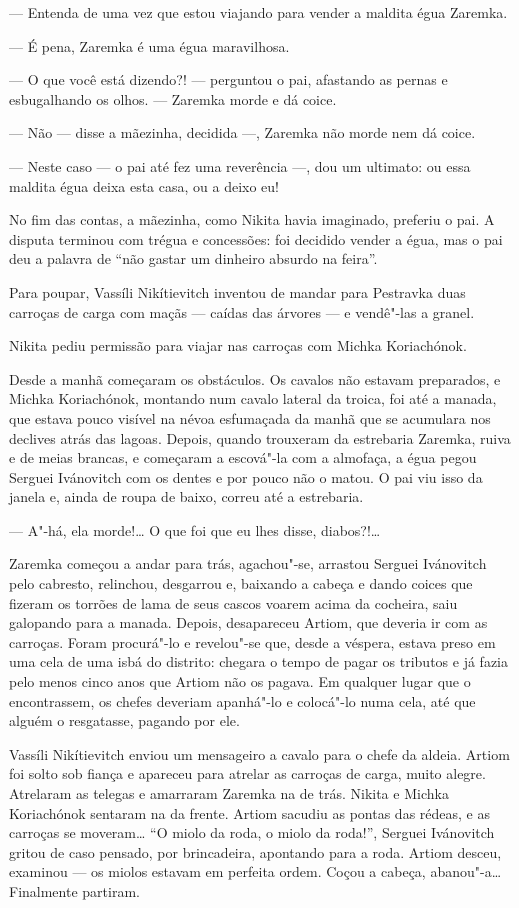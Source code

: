 --- Entenda de uma vez que estou viajando para vender a maldita égua
Zaremka.

--- É pena, Zaremka é uma égua maravilhosa.

--- O que você está dizendo?! --- perguntou o pai, afastando as pernas e
esbugalhando os olhos. --- Zaremka morde e dá coice.

--- Não --- disse a mãezinha, decidida ---, Zaremka não morde nem dá
coice.

--- Neste caso --- o pai até fez uma reverência ---, dou um ultimato: ou
essa maldita égua deixa esta casa, ou a deixo eu!

No fim das contas, a mãezinha, como Nikita havia imaginado, preferiu o
pai. A disputa terminou com trégua e concessões: foi decidido vender a
égua, mas o pai deu a palavra de ``não gastar um dinheiro absurdo na
feira''.

Para poupar, Vassíli Nikítievitch inventou de mandar para
Pestravka duas carroças de carga com maçãs --- caídas das árvores --- e
vendê"-las a granel.

Nikita pediu permissão para viajar nas carroças com Michka Koriachónok.

Desde a manhã começaram os obstáculos. Os cavalos não estavam
preparados, e Michka Koriachónok, montando num cavalo lateral da troica,
foi até a manada, que estava pouco visível na névoa esfumaçada da manhã
que se acumulara nos declives atrás das lagoas. Depois, quando trouxeram
da estrebaria Zaremka, ruiva e de meias brancas, e começaram a escová"-la
com a almofaça, a égua pegou Serguei Ivánovitch com os dentes e por
pouco não o matou. O pai viu isso da janela e, ainda de roupa de baixo,
correu até a estrebaria.

--- A"-há, ela morde!\ldots{} O que foi que eu lhes disse, diabos?!\ldots{}

Zaremka começou a andar para trás, agachou"-se, arrastou Serguei
Ivánovitch pelo cabresto, relinchou, desgarrou e, baixando a cabeça e
dando coices que fizeram os torrões de lama de seus cascos voarem acima
da cocheira, saiu galopando para a manada. Depois, desapareceu Artiom,
que deveria ir com as carroças. Foram procurá"-lo e revelou"-se que, desde
a véspera, estava preso em uma cela de uma isbá do distrito: chegara o
tempo de pagar os tributos e já fazia pelo menos cinco anos que Artiom
não os pagava. Em qualquer lugar que o encontrassem, os chefes deveriam
apanhá"-lo e colocá"-lo numa cela, até que alguém o resgatasse, pagando
por ele.

Vassíli Nikítievitch enviou um mensageiro a cavalo para o chefe da
aldeia. Artiom foi solto sob fiança e apareceu para atrelar as carroças
de carga, muito alegre. Atrelaram as telegas e amarraram Zaremka na de
trás. Nikita e Michka Koriachónok sentaram na da frente. Artiom sacudiu
as pontas das rédeas, e as carroças se moveram\ldots{} ``O miolo da roda, o
miolo da roda!'', Serguei Ivánovitch gritou de caso pensado, por
brincadeira, apontando para a roda. Artiom desceu, examinou --- os
miolos estavam em perfeita ordem. Coçou a cabeça, abanou"-a\ldots{} Finalmente
partiram.

